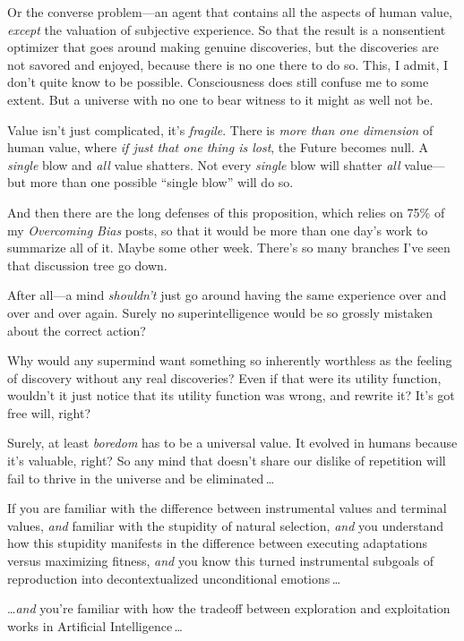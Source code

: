  Or the converse problem---an agent that contains all the aspects
of human value, \textit{except} the valuation of subjective experience.
So that the result is a nonsentient optimizer that goes around making
genuine discoveries, but the discoveries are not savored and enjoyed,
because there is no one there to do so. This, I admit, I
don't quite know to be possible. Consciousness does
still confuse me to some extent. But a universe with no one to bear
witness to it might as well not be.


 Value isn't just complicated, it's
\textit{fragile}. There is \textit{more than one dimension} of human
value, where \textit{if just that one thing is lost}, the Future
becomes null. A \textit{single} blow and \textit{all} value shatters.
Not every \textit{single} blow will shatter \textit{all} value---but
more than one possible ``single
blow'' will do so.


 And then there are the long defenses of this proposition, which
relies on 75\% of my \textit{Overcoming Bias} posts, so that it would
be more than one day's work to summarize all of it.
Maybe some other week. There's so many branches
I've seen that discussion tree go down.


 After all---a mind \textit{shouldn't} just go
around having the same experience over and over and over again. Surely
no superintelligence would be so grossly mistaken about the correct
action?


 Why would any supermind want something so inherently worthless as
the feeling of discovery without any real discoveries? Even if that
were its utility function, wouldn't it just notice that
its utility function was wrong, and rewrite it? It's
got free will, right?


 Surely, at least \textit{boredom} has to be a universal value. It
evolved in humans because it's valuable, right? So any
mind that doesn't share our dislike of repetition will
fail to thrive in the universe and be eliminated\,\ldots


 If you are familiar with the difference between instrumental
values and terminal values, \textit{and} familiar with the stupidity of
natural selection, \textit{and} you understand how this stupidity
manifests in the difference between executing adaptations versus
maximizing fitness, \textit{and} you know this turned instrumental
subgoals of reproduction into decontextualized unconditional emotions\,\ldots


 \ldots \textit{and} you're familiar with how the
tradeoff between exploration and exploitation works in Artificial
Intelligence\,\ldots


